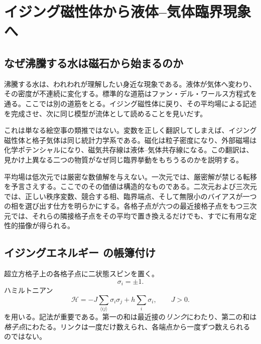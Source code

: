 \chapter{イジング磁性体から液体--気体臨界現象へ}


\section{なぜ沸騰する水は磁石から始まるのか}

沸騰する水は、われわれが理解したい身近な現象である。液体が気体へ変わり、その密度が不連続に変化する。標準的な道筋はファン・デル・ワールス方程式を通る。ここでは別の道筋をとる。イジング磁性体に戻り、その平均場による記述を完成させ、次に同じ模型が流体として読めることを見いだす。

これは単なる絵空事の類推ではない。変数を正しく翻訳してしまえば、イジング磁性体と格子気体は同じ統計力学系である。磁化は粒子密度になり、外部磁場は化学ポテンシャルになり、磁気共存線は液体--気体共存線になる。この翻訳は、見かけ上異なる二つの物質がなぜ同じ臨界挙動をもちうるのかを説明する。

平均場は低次元では厳密な数値解を与えない。一次元では、厳密解が禁じる転移を予言さえする。ここでのその価値は構造的なものである。二次元および三次元では、正しい秩序変数、競合する相、臨界端点、そして無限小のバイアスが一つの相を選び出す仕方を明らかにする。各格子点が六つの最近接格子点をもつ三次元では、それらの隣接格子点をその平均で置き換えるだけでも、すでに有用な定性的描像が得られる。

\section{イジングエネルギー の帳簿付け}

超立方格子上の各格子点に二状態スピンを置く。
\begin{equation}
\sigma_i=\pm1.
\end{equation}
ハミルトニアン
\begin{equation}
\mathcal H
=-J\sum_{\langle ij\rangle}\sigma_i\sigma_j
+h\sum_i\sigma_i,
\qquad J>0.
\label{eq:ising-hamiltonian}
\end{equation}
を用いる。記法が重要である。第一の和は最近接の\emph{リンク}にわたり、第二の和は\emph{格子点}にわたる。リンクは一度だけ数えられ、各端点から一度ずつ数えられるのではない。

